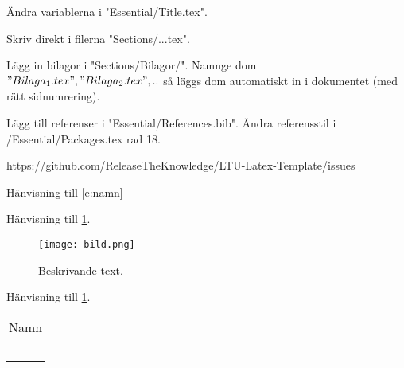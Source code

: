 Ändra variablerna i "Essential/Title.tex".

Skriv direkt i filerna "Sections/...tex".

Lägg in bilagor i "Sections/Bilagor/".
Namnge dom $"Bilaga_1.tex", "Bilaga_2.tex",..$ så läggs dom automatiskt in i dokumentet (med rätt sidnumrering).

Lägg till referenser i "Essential/References.bib".
Ändra referensstil i /Essential/Packages.tex rad 18.

https://github.com/ReleaseTheKnowledge/LTU-Latex-Template/issues



Hänvisning till \cref{e:namn}
\begin{equation} \label{e:namn}
\end{equation}


Hänvisning till \cref{f:namn}.
\begin{figure} [H]
    \centering 
    \texttt{[image: bild.png]}
    \caption{Beskrivande text.}
    \label{f:namn}
\end{figure}


Hänvisning till \cref{t:namn}.
\begin{table}[H]
\centering
\caption{Namn} \label{t:namn}
\begin{tabular}{@{} l l l @{}} \toprule
\B{} & \B{} & \B{} \\
\midrule
     &  &  \\
     &  &  \\
     &  &  \\
\bottomrule
\end{tabular}
\end{table}


